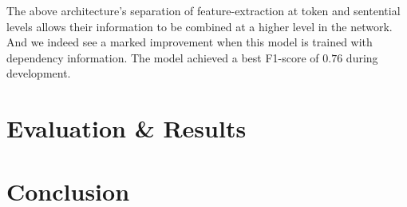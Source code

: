 \documentclass[11pt]{article}
\begin{document}
The above architecture's separation of feature-extraction at token and sentential levels allows their information to be combined
at a higher level in the network. And we indeed see a marked improvement when this model is trained with dependency information.
The model achieved a best F1-score of $0.76$ during development.


\section{Evaluation \& Results}


\section{Conclusion}





\end{document}
